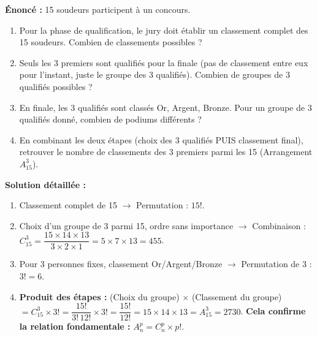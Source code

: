 \documentclass[11pt]{article}
\begin{document}
\begin{exoresolu}
\textbf{Énoncé :} 15 soudeurs participent à un concours.
\begin{enumerate}
    \item Pour la phase de qualification, le jury doit établir un classement complet des 15 soudeurs. Combien de classements possibles ?
    \item Seuls les 3 premiers sont qualifiés pour la finale (pas de classement entre eux pour l'instant, juste le groupe des 3 qualifiés). Combien de groupes de 3 qualifiés possibles ?
    \item En finale, les 3 qualifiés sont classés Or, Argent, Bronze. Pour un groupe de 3 qualifiés donné, combien de podiums différents ?
    \item En combinant les deux étapes (choix des 3 qualifiés PUIS classement final), retrouver le nombre de classements des 3 premiers parmi les 15 (Arrangement $A_{15}^3$).
\end{enumerate}
\tcblower
\textbf{Solution détaillée :}
\begin{enumerate}
    \item Classement complet de 15 $\rightarrow$ Permutation : $15!$.
    \item Choix d'un groupe de 3 parmi 15, ordre sans importance $\rightarrow$ Combinaison : $C_{15}^3 = \dfrac{15 \times 14 \times 13}{3 \times 2 \times 1} = 5 \times 7 \times 13 = 455$.
    \item Pour 3 personnes fixes, classement Or/Argent/Bronze $\rightarrow$ Permutation de 3 : $3! = 6$.
    \item \textbf{Produit des étapes :} (Choix du groupe) $\times$ (Classement du groupe) $= C_{15}^3 \times 3! = \dfrac{15!}{3!\,12!} \times 3! = \dfrac{15!}{12!} = 15 \times 14 \times 13 = A_{15}^3 = 2730$.
    \textbf{Cela confirme la relation fondamentale :} $A_n^p = C_n^p \times p!$.
\end{enumerate}
\end{exoresolu}
\end{document}
